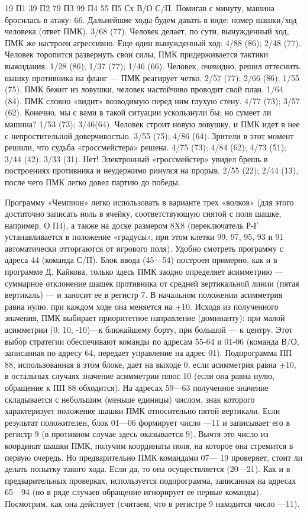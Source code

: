 \documentclass[11pt,a4paper,oneside]{article}
\begin{document}
19 П1 39 П2 79 ПЗ 99 П4 55 П5 Сх В/О С/П. Помигав с минуту, машина бросилась в атаку: 66. Дальнейшие ходы будем давать в виде: номер шашки/ход человека (ответ ПМК). 3/68 (77). Человек делает, по сути, вынужденный ход, ПМК же настроен агрессивно. Еще один вынужденный ход: 4/88 (86); 2/48 (77). Человек торопится развернуть свои силы, ПМК придерживается тактики выжидания. 1/28 (86); 1/37 (77); 1/46 (66). Человек, очевидно, решил оттеснить шашку противника на фланг — ПМК реагирует четко. 2/57 (77); 2/66 (86); 1/55 (75). ПМК бежит из ловушки, человек настойчиво проводит свой план. 1/64 (84). ПМК словно «видит» возводимую перед ним глухую стену. 4/77 (73); 3/57 (62). Конечно, мы с вами в такой ситуации ускользнули бы; но сумеет ли машина? 1/53 (73); 3/46(64). Человек строит новую ловушку, и ПМК идет в нее с непростительной доверчивостью. 3/55 (75); 4/86 (64). Зрители в этот момент решили, что судьба «гроссмейстера» решена. 4/75 (73); 4/84 (62); 4/73 (51); 3/44 (42); 3/33 (31). Нет! Электронный «гроссмейстер» увидел брешь в построениях противника и неудержимо ринулся на прорыв. 2/55 (22); 2/44 (13), после чего ПМК легко довел партию до победы.

Программу «Чемпион» легко использовать в варианте трех «волков» (для этого достаточно записать ноль в ячейку, соответствующую снятой с поля шашке, например, О П4), а также на доске размером 8X8 (переключатель Р-Г устанавливается в положение «градусы», при этом клетки 99, 97, 95, 93 и 91 автоматически отторгаются от игрового поля). Удобно смотреть программу с адреса 44 (команда С/П). Блок ввода (45—54) построен примерно, как и в программе Д. Кайкова, только здесь ПМК заодно определяет асимметрию — суммарное отклонение шашек противника от средней вертикальной линии (пятая вертикаль) — и заносит ее в регистр 7. В начальном положении асимметрия равна нулю, при каждом ходе она меняется на $\pm$10. Исходя из полученного значения, ПМК выбирает приоритетное направление (доминанту): при малой асимметрии (0, 10, -10)—к ближайшему борту, при большой — к центру. Этот выбор стратегии обеспечивают команды по адресам 55-64 и 01-06 (команда В/О, записанная по адресу 64, передает управление на адрес 01). Подпрограмма ПП 88, использованная в этом блоке, дает на выходе 0, если асимметрия равна $\pm$10, в остальных случаях значение асимметрии плюс 10 (если она равна нулю, обращение к ПП 88 обходится). На адресах 59—63 полученное значение складывается с небольшим (меньше единицы) числом, знак которого характеризует положение шашки ПМК относительно пятой вертикали. Если результат положителен, блок 01—06 формирует число —11 и записывает его в регистр 9 (в противном случае здесь оказывается 9). Вычтя это число из координат шашки ПМК, получим координаты поля, на которое она стремится в первую очередь. Но предварительно ПМК командами 07— 19 проверяет, стоит ли делать попытку такого хода. Если да, то она осуществляется (20—21). Как и в предварительных проверках, используется подпрограмма, записанная на адресах 65—94 (но в ряде случаев обращение игнорирует ее первые команды). Посмотрим, как она действует (считаем, что в регистре 9 находится число —11).
\end{document}
